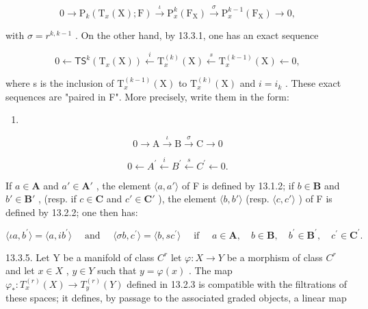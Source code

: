 \[
0 \rightarrow \mathrm{P} _ {k} (\mathrm{T} _ {x} (\mathrm{X}); \mathrm{F}) \stackrel {{\iota}} {{\rightarrow}} \mathrm{P} _ {x} ^ {k} (\mathrm{F} _ {\mathrm{X}}) \stackrel {{\sigma}} {{\rightarrow}} \mathrm{P} _ {x} ^ {k - 1} (\mathrm{F} _ {\mathrm{X}}) \rightarrow 0,\tag{i}
\]

with \(\sigma = r^{k, k-1}\) . On the other hand, by 13.3.1, one has an exact sequence

\[
0 \leftarrow \mathsf {T S} ^ {k} (\mathrm{T} _ {x} (\mathrm{X})) \stackrel {{i}} {{\leftarrow}} \mathrm{T} _ {x} ^ {(k)} (\mathrm{X}) \stackrel {{s}} {{\leftarrow}} \mathrm{T} _ {x} ^ {(k - 1)} (\mathrm{X}) \leftarrow 0,\tag{ii}
\]

where s is the inclusion of \(\mathrm{T}_{x}^{(k-1)}(\mathrm{X})\) to \(\mathrm{T}_{x}^{(k)}(\mathrm{X})\) and \(i=i_{k}\) . These exact sequences are "paired in F". More precisely, write them in the form:

\begin{enumerate}
\def\labelenumi{(\roman{enumi})}
\tightlist
\item
\end{enumerate}

\[
0 \rightarrow \mathrm{A} \xrightarrow {\iota} \mathrm{B} \xrightarrow {\sigma} \mathrm{C} \rightarrow 0\tag{ii}
\]

\[
0 \leftarrow A ^ {\prime} \stackrel {i} {\leftarrow} B ^ {\prime} \stackrel {s} {\leftarrow} C ^ {\prime} \leftarrow 0.
\]

If \(a \in \mathbf{A}\) and \(a' \in \mathbf{A}'\) , the element \(\langle a, a' \rangle\) of F is defined by 13.1.2; if \(b \in \mathbf{B}\) and \(b' \in \mathbf{B}'\) , (resp. if \(c \in \mathbf{C}\) and \(c' \in \mathbf{C}'\) ), the element \(\langle b, b' \rangle\) (resp. \(\langle c, c' \rangle\) ) of F is defined by 13.2.2; one then has:

\[
\langle \iota a, b ^ {\prime} \rangle = \langle a, i b ^ {\prime} \rangle \quad \text { and } \quad \langle \sigma b, c ^ {\prime} \rangle = \langle b, s c ^ {\prime} \rangle \quad \text { if } \quad a \in \mathbf {A}, \quad b \in \mathbf {B}, \quad b ^ {\prime} \in \mathbf {B} ^ {\prime}, \quad c ^ {\prime} \in \mathbf {C} ^ {\prime}.
\]

13.3.5. Let Y be a manifold of class \(C^{r}\) let \(\varphi: X \to Y\) be a morphism of class \(C^{r}\) and let \(x \in X\) , \(y \in Y\) such that \(y = \varphi(x)\) . The map \(\varphi_{*}: T_{x}^{(r)}(X) \to T_{y}^{(r)}(Y)\) defined in 13.2.3 is compatible with the filtrations of these spaces; it defines, by passage to the associated graded objects, a linear map

